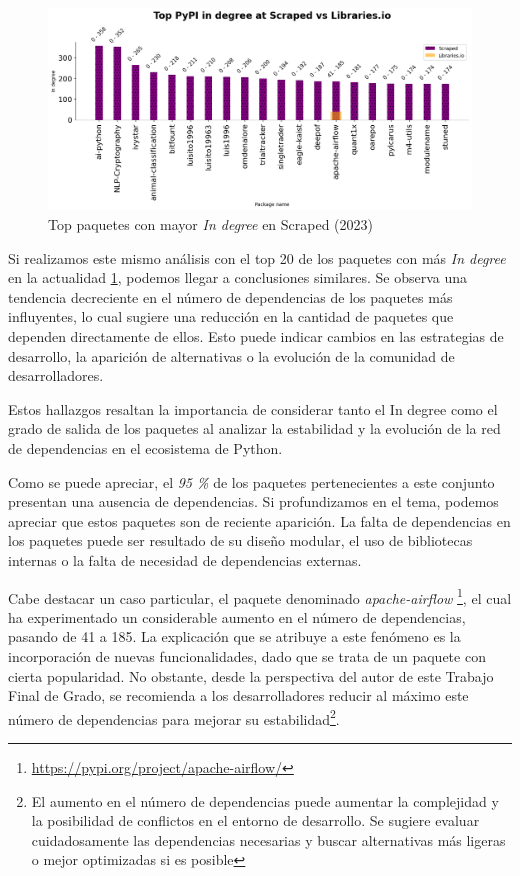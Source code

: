 \begin{figure}[ht!]
    \begin{center}
        \includegraphics[width=1\textwidth]{img/pypi/scraped_t20_ind_comparison.png}
        \caption{Top paquetes con mayor \textit{In degree} en Scraped (2023)}
        \label{fig:pypi_scraped_ind_comparison}
    \end{center}
\end{figure}

Si realizamos este mismo análisis con el top 20 de los paquetes con más \textit{In degree} en la
actualidad \ref{fig:pypi_scraped_ind_comparison}, podemos llegar a
conclusiones similares. Se observa una tendencia decreciente en el número de dependencias de los paquetes
más influyentes, lo cual sugiere una reducción en la cantidad de paquetes que dependen directamente de ellos.
Esto puede indicar cambios en las estrategias de desarrollo, la aparición de alternativas o la evolución de la
comunidad de desarrolladores.

Estos hallazgos resaltan la importancia de considerar tanto el In degree como el grado de salida de
los paquetes al analizar la estabilidad y la evolución de la red de dependencias en el ecosistema de Python.

Como se puede apreciar, el \textit{95 \%} de los paquetes pertenecientes a este conjunto presentan una ausencia
de dependencias.
Si profundizamos en el tema, podemos apreciar que estos paquetes son de reciente aparición. La falta de
dependencias en los paquetes puede ser resultado de su diseño modular, el uso de
bibliotecas internas o la falta de necesidad de dependencias externas.

Cabe destacar un caso particular, el paquete denominado \textit{apache-airflow}
\footnote{\url{https://pypi.org/project/apache-airflow/}}, el cual ha experimentado un considerable aumento
en el número de dependencias, pasando de 41 a 185. La explicación que se atribuye a este fenómeno es la
incorporación de nuevas funcionalidades, dado que se trata de un paquete con cierta popularidad. No obstante,
desde la perspectiva del autor de este Trabajo Final de Grado, se recomienda a los desarrolladores reducir
al máximo este número de dependencias para mejorar su estabilidad\footnote{El aumento en el número de dependencias
    puede aumentar la complejidad y la posibilidad de conflictos en el entorno de desarrollo. Se sugiere evaluar
    cuidadosamente las dependencias necesarias y buscar alternativas más ligeras o mejor optimizadas si es posible}.

